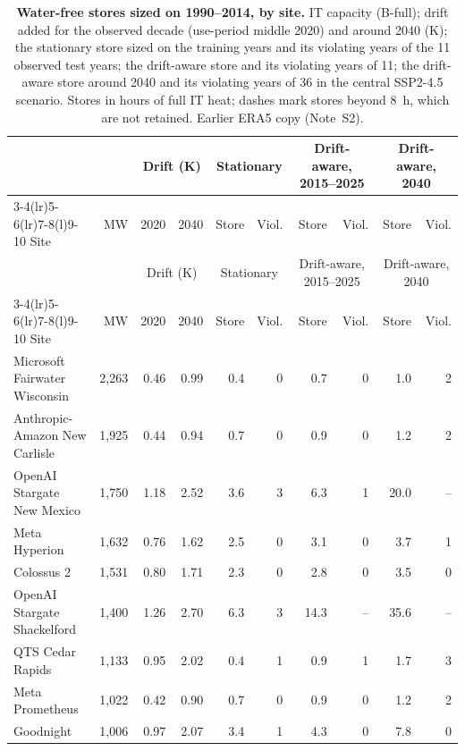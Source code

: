 {\scriptsize\setlength{\tabcolsep}{3pt}
\begin{longtable}{@{}lrrrrrrrrr@{}}
\caption{\textbf{Water-free stores sized on 1990--2014, by site.} IT capacity (B-full); drift added for the observed decade (use-period middle 2020) and around 2040 (K); the stationary store sized on the training years and its violating years of the 11 observed test years; the drift-aware store and its violating years of 11; the drift-aware store around 2040 and its violating years of 36 in the central SSP2-4.5 scenario. Stores in hours of full IT heat; dashes mark stores beyond 8~h, which are not retained. Earlier ERA5 copy (Note~S2).}\label{tab:s10}\\
\toprule
& & \multicolumn{2}{c}{Drift (K)} & \multicolumn{2}{c}{Stationary} & \multicolumn{2}{c}{Drift-aware, 2015--2025} & \multicolumn{2}{c}{Drift-aware, 2040}\\
\cmidrule(lr){3-4}\cmidrule(lr){5-6}\cmidrule(lr){7-8}\cmidrule(l){9-10}
Site & MW & 2020 & 2040 & Store & Viol. & Store & Viol. & Store & Viol.\\
\midrule
\endfirsthead
\toprule
& & \multicolumn{2}{c}{Drift (K)} & \multicolumn{2}{c}{Stationary} & \multicolumn{2}{c}{Drift-aware, 2015--2025} & \multicolumn{2}{c}{Drift-aware, 2040}\\
\cmidrule(lr){3-4}\cmidrule(lr){5-6}\cmidrule(lr){7-8}\cmidrule(l){9-10}
Site & MW & 2020 & 2040 & Store & Viol. & Store & Viol. & Store & Viol.\\
\midrule
\endhead
\bottomrule
\endfoot
Microsoft Fairwater Wisconsin & 2,263 & 0.46 & 0.99 & 0.4 & 0 & 0.7 & 0 & 1.0 & 2 \\
Anthropic-Amazon New Carlisle & 1,925 & 0.44 & 0.94 & 0.7 & 0 & 0.9 & 0 & 1.2 & 2 \\
OpenAI Stargate New Mexico & 1,750 & 1.18 & 2.52 & 3.6 & 3 & 6.3 & 1 & 20.0 & -- \\
Meta Hyperion & 1,632 & 0.76 & 1.62 & 2.5 & 0 & 3.1 & 0 & 3.7 & 1 \\
Colossus 2 & 1,531 & 0.80 & 1.71 & 2.3 & 0 & 2.8 & 0 & 3.5 & 0 \\
OpenAI Stargate Shackelford & 1,400 & 1.26 & 2.70 & 6.3 & 3 & 14.3 & -- & 35.6 & -- \\
QTS Cedar Rapids & 1,133 & 0.95 & 2.02 & 0.4 & 1 & 0.9 & 1 & 1.7 & 3 \\
Meta Prometheus & 1,022 & 0.42 & 0.90 & 0.7 & 0 & 0.9 & 0 & 1.2 & 2 \\
Goodnight & 1,006 & 0.97 & 2.07 & 3.4 & 1 & 4.3 & 0 & 7.8 & 0 \\

\end{longtable}}
